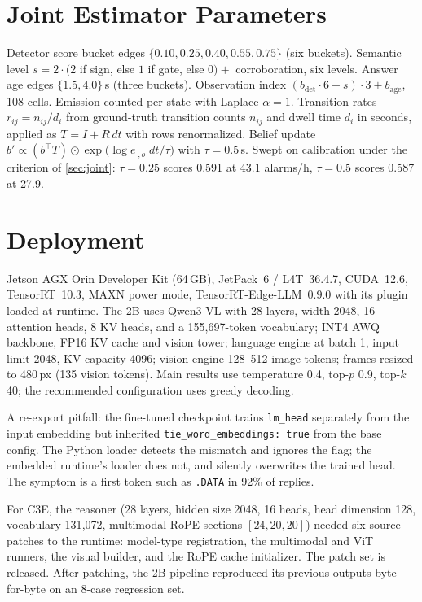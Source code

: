 \documentclass[journal]{IEEEtran}
\begin{document}
\section{Joint Estimator Parameters}
\label{app:joint}

Detector score bucket edges $\{0.10, 0.25, 0.40, 0.55, 0.75\}$ (six buckets). Semantic level $s = 2\cdot(2$ if sign, else $1$ if gate, else $0) +$ corroboration, six levels.  Answer age edges $\{1.5, 4.0\}$\,s (three buckets). Observation index $(b_\text{det}\cdot 6 + s)\cdot 3 + b_\text{age}$, 108 cells. Emission counted per state with Laplace $\alpha = 1$.  Transition rates $r_{ij} = n_{ij}/d_i$ from ground-truth transition counts $n_{ij}$ and dwell time $d_i$ in seconds, applied as $T = I + R\,dt$ with rows renormalized.  Belief update $b' \propto (b^\top T) \odot \exp\!\big(\log e_{\cdot,o}\; dt/\tau\big)$ with $\tau = 0.5$\,s.  Swept on calibration under the criterion of \cref{sec:joint}: $\tau = 0.25$ scores 0.591 at 43.1 alarms/h, $\tau = 0.5$ scores 0.587 at 27.9.

\section{Deployment}
\label{app:deploy}

Jetson AGX Orin Developer Kit (64\,GB), JetPack~6 / L4T~36.4.7, CUDA~12.6, TensorRT~10.3, MAXN power mode, TensorRT-Edge-LLM~0.9.0 with its plugin loaded at runtime.  The 2B uses Qwen3-VL with 28 layers, width 2048, 16 attention heads, 8 KV heads, and a 155{,}697-token vocabulary; INT4 AWQ backbone, FP16 KV cache and vision tower; language engine at batch 1, input limit 2048, KV capacity 4096; vision engine 128--512 image tokens; frames resized to 480\,px (135 vision tokens).  Main results use temperature 0.4, top-$p$ 0.9, top-$k$ 40; the recommended configuration uses greedy decoding.

A re-export pitfall: the fine-tuned checkpoint trains \texttt{lm\_head} separately from the input embedding but inherited \texttt{tie\_word\_embeddings: true} from the base config.  The Python loader detects the mismatch and ignores the flag; the embedded runtime's loader does not, and silently overwrites the trained head.  The symptom is a first token such as \texttt{.DATA} in 92\% of replies.

For C3E, the reasoner (28 layers, hidden size 2048, 16 heads, head dimension 128, vocabulary 131{,}072, multimodal RoPE sections $[24,20,20]$) needed six source patches to the runtime: model-type registration, the multimodal and ViT runners, the visual builder, and the RoPE cache initializer.  The patch set is released.  After patching, the 2B pipeline reproduced its previous outputs byte-for-byte on an 8-case regression set.
\end{document}
